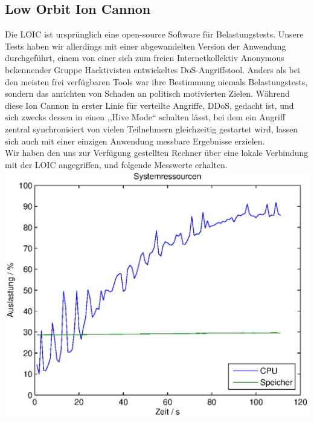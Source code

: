\documentclass[12pt,a4paper]{article}
\begin{document}
\subsection{Low Orbit Ion Cannon}
Die LOIC ist ursprünglich eine open-source Software für Belastungstests. Unsere Tests haben wir allerdings mit einer abgewandelten Version der Anwendung durchgeführt, einem von einer sich zum freien Internetkollektiv Anonymous bekennender Gruppe Hacktivisten entwickeltes DoS-Angriffstool. Anders als bei den meisten frei verfügbaren Tools war ihre Bestimmung niemals Belastungstests, sondern das anrichten von Schaden an politisch motivierten Zielen. Während diese Ion Cannon in erster Linie für verteilte Angriffe, DDoS, gedacht ist, und sich zwecks dessen in einen ,,Hive Mode`` schalten lässt, bei dem ein Angriff zentral synchronisiert von vielen Teilnehmern gleichzeitig gestartet wird, lassen sich auch mit einer einzigen Anwendung messbare Ergebnisse erzielen.\\
Wir haben den uns zur Verfügung gestellten Rechner über eine lokale Verbindung mit der LOIC angegriffen, und folgende Messwerte erhalten.\\
\includegraphics[scale=0.9]{MatLab/LOICVictimSys.eps}\\
\end{document}
